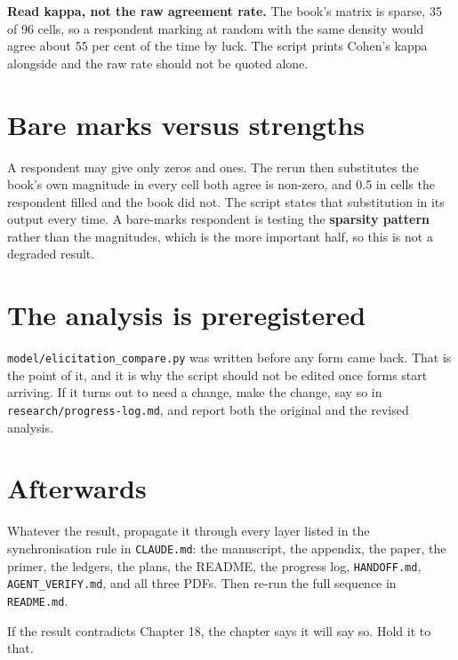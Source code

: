 \documentclass[11pt]{article}
\begin{document}
\begin{note}
\textbf{Read kappa, not the raw agreement rate.} The book's matrix is sparse, 35 of 96 cells, so a
respondent marking at random with the same density would agree about 55 per cent of the time by
luck. The script prints Cohen's kappa alongside and the raw rate should not be quoted alone.
\end{note}

\section{Bare marks versus strengths}

A respondent may give only zeros and ones. The rerun then substitutes the book's own magnitude in
every cell both agree is non-zero, and 0.5 in cells the respondent filled and the book did not.
The script states that substitution in its output every time. A bare-marks respondent is testing
the \textbf{sparsity pattern} rather than the magnitudes, which is the more important half, so
this is not a degraded result.

\section{The analysis is preregistered}

\texttt{model/elicitation\_compare.py} was written before any form came back. That is the point of
it, and it is why the script should not be edited once forms start arriving. If it turns out to
need a change, make the change, say so in \texttt{research/progress-log.md}, and report both the
original and the revised analysis.

\section{Afterwards}

Whatever the result, propagate it through every layer listed in the synchronisation rule in
\texttt{CLAUDE.md}: the manuscript, the appendix, the paper, the primer, the ledgers, the plans,
the README, the progress log, \texttt{HANDOFF.md}, \texttt{AGENT\_VERIFY.md}, and all three PDFs.
Then re-run the full sequence in \texttt{README.md}.

\begin{warning}
If the result contradicts Chapter 18, the chapter says it will say so. Hold it to that.
\end{warning}
\end{document}
